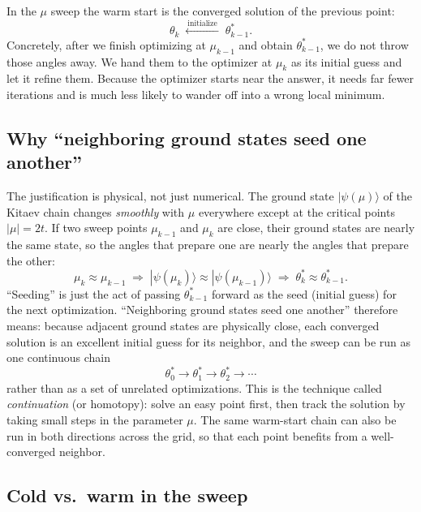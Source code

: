 \documentclass[11pt]{article}
\newcommand{\ket}[1]{|#1\rangle}
\begin{document}
In the $\mu$ sweep the warm start is the converged solution of the previous point:
\begin{equation}
  \theta_k \;\xleftarrow{\ \text{initialize}\ }\; \theta_{k-1}^{*}.
\end{equation}
Concretely, after we finish optimizing at $\mu_{k-1}$ and obtain $\theta_{k-1}^{*}$, we do not throw those angles away. We hand them to the optimizer at $\mu_k$ as its initial guess and let it refine them. Because the optimizer starts near the answer, it needs far fewer iterations and is much less likely to wander off into a wrong local minimum.

\subsection*{Why ``neighboring ground states seed one another''}

The justification is physical, not just numerical. The ground state $\ket{\psi(\mu)}$ of the Kitaev chain changes \emph{smoothly} with $\mu$ everywhere except at the critical points $|\mu|=2t$. If two sweep points $\mu_{k-1}$ and $\mu_k$ are close, their ground states are nearly the same state, so the angles that prepare one are nearly the angles that prepare the other:
\begin{equation}
  \mu_k \approx \mu_{k-1}
  \;\Longrightarrow\;
  \ket{\psi(\mu_k)} \approx \ket{\psi(\mu_{k-1})}
  \;\Longrightarrow\;
  \theta_k^{*} \approx \theta_{k-1}^{*}.
\end{equation}
``Seeding'' is just the act of passing $\theta_{k-1}^{*}$ forward as the seed (initial guess) for the next optimization. ``Neighboring ground states seed one another'' therefore means: because adjacent ground states are physically close, each converged solution is an excellent initial guess for its neighbor, and the sweep can be run as one continuous chain
\begin{equation}
  \theta_0^{*} \to \theta_1^{*} \to \theta_2^{*} \to \cdots
\end{equation}
rather than as a set of unrelated optimizations. This is the technique called \emph{continuation} (or homotopy): solve an easy point first, then track the solution by taking small steps in the parameter $\mu$. The same warm-start chain can also be run in both directions across the grid, so that each point benefits from a well-converged neighbor.

\subsection*{Cold vs.\ warm in the sweep}
\end{document}
